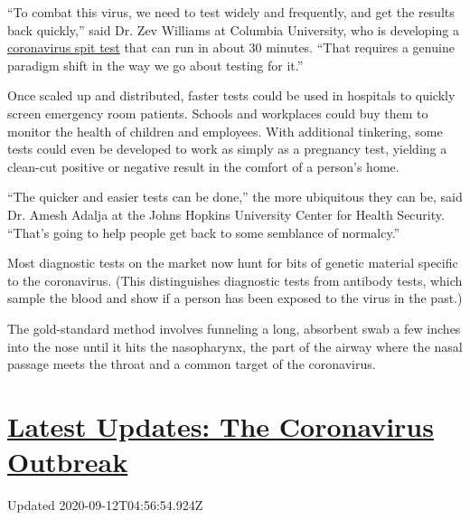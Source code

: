 ``To combat this virus, we need to test widely and frequently, and get
the results back quickly,'' said Dr. Zev Williams at Columbia
University, who is developing a
\href{https://www.medrxiv.org/content/10.1101/2020.06.13.20129841v1.full.pdf}{coronavirus
spit test} that can run in about 30 minutes. ``That requires a genuine
paradigm shift in the way we go about testing for it.''

Once scaled up and distributed, faster tests could be used in hospitals
to quickly screen emergency room patients. Schools and workplaces could
buy them to monitor the health of children and employees. With
additional tinkering, some tests could even be developed to work as
simply as a pregnancy test, yielding a clean-cut positive or negative
result in the comfort of a person's home.

``The quicker and easier tests can be done,'' the more ubiquitous they
can be, said Dr. Amesh Adalja at the Johns Hopkins University Center for
Health Security. ``That's going to help people get back to some
semblance of normalcy.''

Most diagnostic tests on the market now hunt for bits of genetic
material specific to the coronavirus. (This distinguishes diagnostic
tests from antibody tests, which sample the blood and show if a person
has been exposed to the virus in the past.)

The gold-standard method involves funneling a long, absorbent swab a few
inches into the nose until it hits the nasopharynx, the part of the
airway where the nasal passage meets the throat and a common target of
the coronavirus.

\hypertarget{latest-updates-the-coronavirus-outbreak}{%
\section{\texorpdfstring{\href{https://www.nytimes3xbfgragh.onion/2020/09/11/world/covid-19-coronavirus.html?action=click\&pgtype=Article\&state=default\&region=MAIN_CONTENT_1\&context=storylines_live_updates}{Latest
Updates: The Coronavirus
Outbreak}}{Latest Updates: The Coronavirus Outbreak}}\label{latest-updates-the-coronavirus-outbreak}}

Updated 2020-09-12T04:56:54.924Z

